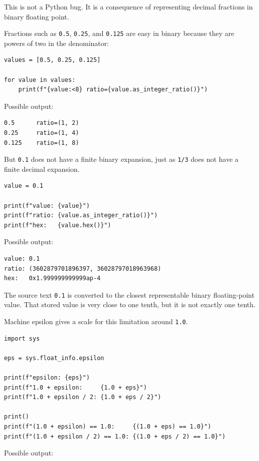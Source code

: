 This is not a Python bug. It is a consequence of representing decimal fractions in binary floating point.

Fractions such as \texttt{0.5}, \texttt{0.25}, and \texttt{0.125} are easy in binary because they are powers of two in the denominator:

\begin{verbatim}
values = [0.5, 0.25, 0.125]

for value in values:
    print(f"{value:<8} ratio={value.as_integer_ratio()}")
\end{verbatim}

Possible output:

\begin{verbatim}
0.5      ratio=(1, 2)
0.25     ratio=(1, 4)
0.125    ratio=(1, 8)
\end{verbatim}

But \texttt{0.1} does not have a finite binary expansion, just as \texttt{1/3} does not have a finite decimal expansion.

\begin{verbatim}
value = 0.1

print(f"value: {value}")
print(f"ratio: {value.as_integer_ratio()}")
print(f"hex:   {value.hex()}")
\end{verbatim}

Possible output:

\begin{verbatim}
value: 0.1
ratio: (3602879701896397, 36028797018963968)
hex:   0x1.999999999999ap-4
\end{verbatim}

The source text \texttt{0.1} is converted to the closest representable binary floating-point value. That stored value is very close to one tenth, but it is not exactly one tenth.

Machine epsilon gives a scale for this limitation around \texttt{1.0}.

\begin{verbatim}
import sys

eps = sys.float_info.epsilon

print(f"epsilon: {eps}")
print(f"1.0 + epsilon:     {1.0 + eps}")
print(f"1.0 + epsilon / 2: {1.0 + eps / 2}")

print()
print(f"(1.0 + epsilon) == 1.0:     {(1.0 + eps) == 1.0}")
print(f"(1.0 + epsilon / 2) == 1.0: {(1.0 + eps / 2) == 1.0}")
\end{verbatim}

Possible output:


